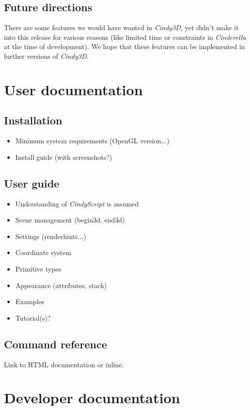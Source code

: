 \documentclass{scrartcl}
\begin{document}
\subsection{Future directions}

There are some features we would have wanted in \emph{Cindy3D}, yet didn't make it into this release for various reasons (like limited time or constraints in \emph{Cinderella} at the time of development). We hope that these features can be implemented in further versions of \emph{Cindy3D}.

\section{User documentation}

\subsection{Installation}

\begin{itemize}
\item Minimum system requirements (OpenGL version...)
\item Install guide (with screenshots?)
\end{itemize}

\subsection{User guide}

\begin{itemize}
\item Understanding of \emph{CindyScript} is assumed
\item Scene management (begin3d, end3d)
\item Settings (renderhints...)
\item Coordinate system
\item Primitive types
\item Appearance (attributes, stack)
\item Examples
\item Tutorial(s)?
\end{itemize}

\subsection{Command reference}

Link to HTML documentation or inline.

\section{Developer documentation}
\end{document}
